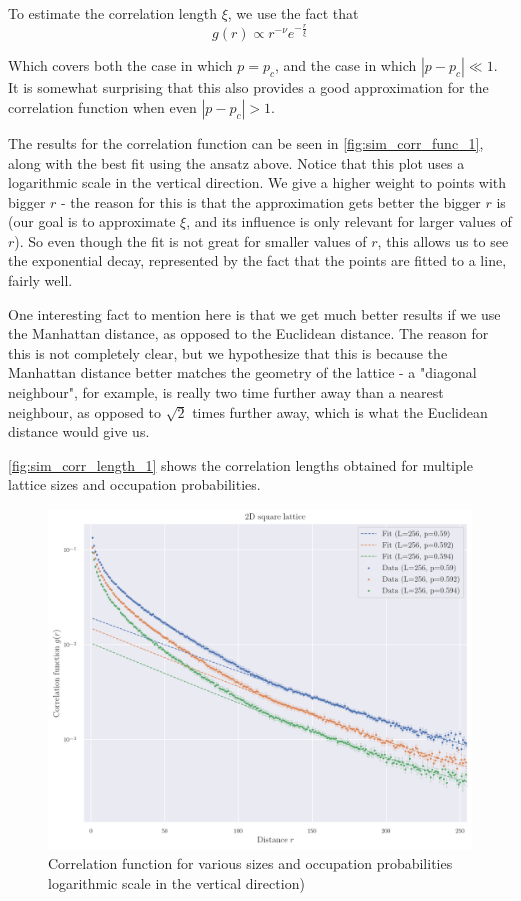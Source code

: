 To estimate the correlation length $\xi$, we use the fact that
$$ 
 g(r) \propto r^{-\nu} e^{-\frac{r}{\xi}}
$$ 

Which covers both the case in which $p=p_c$, and the case in which $|p - p_c| \ll 1$. It is somewhat surprising that this also provides a good approximation for the correlation function when even $|p - p_c| > 1$.


The results for the correlation function can be seen in \autoref{fig:sim_corr_func_1}, along with the best fit using the ansatz above. Notice that this plot uses a logarithmic scale in the vertical direction. We give a higher weight to points with bigger $r$ - the reason for this is that the approximation gets better the bigger $r$ is (our goal is to approximate $\xi$, and its influence is only relevant for larger values of $r$). So even though the fit is not great for smaller values of $r$, this allows us to see the exponential decay, represented by the fact that the points are fitted to a line, fairly well.


One interesting fact to mention here is that we get much better results if we use the Manhattan distance, as opposed to the Euclidean distance. The reason for this is not completely clear, but we hypothesize that this is because the Manhattan distance better matches the geometry of the lattice - a "diagonal neighbour", for example, is really two time further away than a nearest neighbour, as opposed to $\sqrt{2}$ times further away, which is what the Euclidean distance would give us.

\autoref{fig:sim_corr_length_1} shows the correlation lengths obtained for multiple lattice sizes and occupation probabilities. 


\begin{figure}[H]
  \includegraphics[width=\linewidth]{Images/sim_corr_func_2.png}
  \caption{Correlation function for various sizes and occupation probabilities logarithmic scale in the vertical direction)}
  \label{fig:sim_corr_func_1}
\end{figure}


